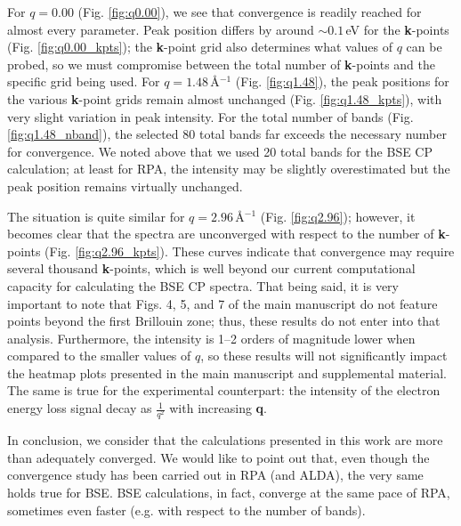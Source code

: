 \documentclass[aps,prb,10pt,superscriptaddress,notitlepage]{revtex4-1}
\begin{document}
For $q=0.00$ (Fig. \ref{fig:q0.00}), we see that convergence is readily reached
for almost every parameter. Peak position differs by around $\sim0.1$\,eV for
the \textbf{k}-points (Fig. \ref{fig:q0.00_kpts}); the \textbf{k}-point grid
also determines what values of $q$ can be probed, so we must compromise between
the total number of \textbf{k}-points and the specific grid being used. For
$q=1.48$\,\r{A}$^{-1}$ (Fig. \ref{fig:q1.48}), the peak positions for the
various \textbf{k}-point grids remain almost unchanged (Fig.
\ref{fig:q1.48_kpts}), with very slight variation in peak intensity. For the
total number of bands (Fig. \ref{fig:q1.48_nband}), the selected 80 total bands
far exceeds the necessary number for convergence. We noted above that we used 20
total bands for the BSE CP calculation; at least for RPA, the intensity may be
slightly overestimated but the peak position remains virtually unchanged.

The situation is quite similar for $q=2.96$\,\r{A}$^{-1}$ (Fig.
\ref{fig:q2.96}); however, it becomes clear that the spectra are unconverged
with respect to the number of \textbf{k}-points (Fig. \ref{fig:q2.96_kpts}).
These curves indicate that convergence may require several thousand
\textbf{k}-points, which is well beyond our current computational capacity for
calculating the BSE CP spectra. That being said, it is very important to note
that Figs. 4, 5, and 7 of the main manuscript do not feature points beyond the
first Brillouin zone; thus, these results do not enter into that analysis.
Furthermore, the intensity is 1--2 orders of magnitude lower when compared to
the smaller values of $q$, so these results will not significantly impact the
heatmap plots presented in the main manuscript and supplemental material. The
same is true for the experimental counterpart: the intensity of the electron
energy loss signal decay as $\frac{1}{q^2}$ with increasing \textbf{q}.

In conclusion, we consider that the calculations presented in this work are more
than adequately converged. We would like to point out that, even though the
convergence study has been carried out in RPA (and ALDA), the very same holds
true for BSE. BSE calculations, in fact, converge at the same pace of RPA,
sometimes even faster (e.g. with respect to the number of bands).

\end{document}
